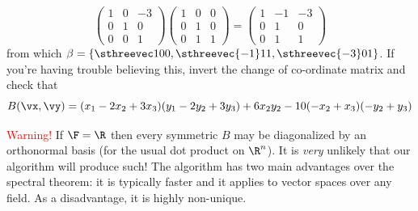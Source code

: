 \begin{examples}{}{}
\begin{enumerate}
\[\begin{pmatrix}
	1&0&-3\\0&1&0\\0&0&1
\end{pmatrix}
\begin{pmatrix}
	1&0&0\\0&1&0\\0&1&1
\end{pmatrix}
=\begin{pmatrix}
	1&-1&-3\\0&1&0\\0&1&1
\end{pmatrix}\]
from which $\beta=\left\{\sthreevec 100,\sthreevec{-1}11,\sthreevec{-3}01\right\}$. If you're having trouble believing this, invert the change of co-ordinate matrix and check that
\[B(\vx,\vy)=(x_1-2x_2+3x_3)(y_1-2y_2+3y_3)+6x_2y_2-10(-x_2+x_3)(-y_2+y_3)\]
\end{enumerate}
\end{examples}


\textcolor{red}{Warning!} If $\F=\R$ then every symmetric $B$ may be diagonalized by an orthonormal basis (for the usual dot product on $\R^n$). It is \emph{very} unlikely that our algorithm will produce such! The algorithm has two main advantages over the spectral theorem: it is typically faster and it applies to vector spaces over any field. As a disadvantage, it is highly non-unique.

\goodbreak

